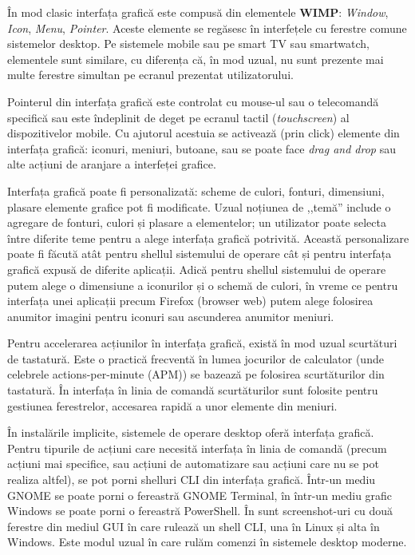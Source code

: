 În mod clasic interfața grafică este compusă din elementele \textbf{WIMP}: \textit{Window}, \textit{Icon}, \textit{Menu}, \textit{Pointer}. Aceste elemente se regăsesc în interfețele cu ferestre comune sistemelor desktop. Pe sistemele mobile sau pe smart TV sau smartwatch, elementele sunt similare, cu diferența că, în mod uzual, nu sunt prezente mai multe ferestre simultan pe ecranul prezentat utilizatorului.

Pointerul din interfața grafică este controlat cu mouse-ul sau o telecomandă specifică sau este îndeplinit de deget pe ecranul tactil (\textit{touchscreen}) al dispozitivelor mobile. Cu ajutorul acestuia se activează (prin click) elemente din interfața grafică: iconuri, meniuri, butoane, sau se poate face \textit{drag and drop} sau alte acțiuni de aranjare a interfeței grafice.

Interfața grafică poate fi personalizată: scheme de culori, fonturi, dimensiuni, plasare elemente grafice pot fi modificate. Uzual noțiunea de ,,temă'' include o agregare de fonturi, culori și plasare a elementelor; un utilizator poate selecta între diferite teme pentru a alege interfața grafică potrivită. Această personalizare poate fi făcută atât pentru shellul sistemului de operare cât și pentru interfața grafică expusă de diferite aplicații. Adică pentru shellul sistemului de operare putem alege o dimensiune a iconurilor și o schemă de culori, în vreme ce pentru interfața unei aplicații precum Firefox (browser web) putem alege folosirea anumitor imagini pentru iconuri sau ascunderea anumitor meniuri.

Pentru accelerarea acțiunilor în interfața grafică, există în mod uzual scurtături de tastatură. Este o practică frecventă în lumea jocurilor de calculator (unde celebrele actions-per-minute (APM)) se bazează pe folosirea scurtăturilor din tastatură. În interfața în linia de comandă scurtăturilor sunt folosite pentru gestiunea ferestrelor, accesarea rapidă a unor elemente din meniuri.

În instalările implicite, sistemele de operare desktop oferă interfața grafică. Pentru tipurile de acțiuni care necesită interfața în linia de comandă (precum acțiuni mai specifice, sau acțiuni de automatizare sau acțiuni care nu se pot realiza altfel), se pot porni shelluri CLI din interfața grafică. Într-un mediu GNOME se poate porni o fereastră GNOME Terminal, în într-un mediu grafic Windows se poate porni o fereastră PowerShell. În  sunt screenshot-uri cu două ferestre din mediul GUI în care rulează un shell CLI, una în Linux și alta în Windows. Este modul uzual în care rulăm comenzi în sistemele desktop moderne.

